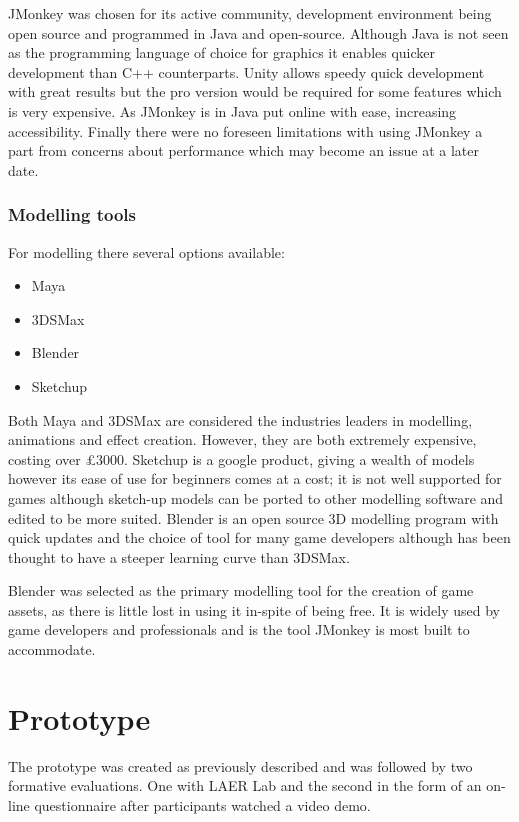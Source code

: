 \documentclass[11pt]{report}
\begin{document}
JMonkey was chosen for its active community, development environment being open source and programmed in Java and open-source. Although Java is not seen as the programming language of choice for graphics it enables quicker development than C++ counterparts. Unity allows speedy quick development with great results but the pro version would be required for some features which is very expensive. As JMonkey is in Java put online with ease, increasing accessibility. Finally there were no foreseen limitations with using JMonkey a part from concerns about performance which may become an issue at a later date.

\subsection{Modelling tools}
For modelling there several options available:
\begin{itemize}
\item Maya
\item 3DSMax
\item Blender
\item Sketchup
\end{itemize}

Both Maya and 3DSMax are considered the industries leaders in modelling, animations and effect creation. However, they are both extremely expensive, costing over £3000. Sketchup is a google product, giving a wealth of models however its ease of use for beginners comes at a cost; it is not well supported for games although sketch-up models can be ported to other modelling software and edited to be more suited. Blender is an open source 3D modelling program with quick updates and the choice of tool for many game developers although has been thought to have a steeper learning curve than 3DSMax.

Blender was selected as the primary modelling tool for the creation of game assets, as there is little lost in using it in-spite of being free. It is widely used by game developers and professionals and is the tool JMonkey is most built to accommodate.

\chapter{Prototype}
The prototype was created as previously described and was followed by two formative evaluations. One with LAER Lab and the second in the form of an on-line questionnaire after participants watched a video demo. 
\end{document}
